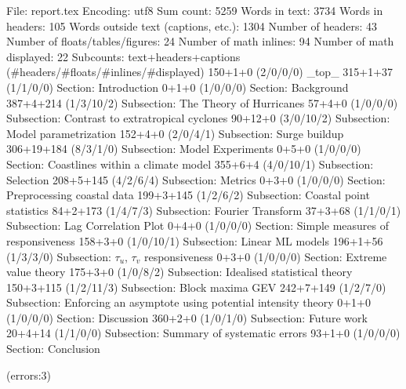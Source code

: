 
File: report.tex
Encoding: utf8
Sum count: 5259
Words in text: 3734
Words in headers: 105
Words outside text (captions, etc.): 1304
Number of headers: 43
Number of floats/tables/figures: 24
Number of math inlines: 94
Number of math displayed: 22
Subcounts:
  text+headers+captions (#headers/#floats/#inlines/#displayed)
  150+1+0 (2/0/0/0) _top_
  315+1+37 (1/1/0/0) Section: Introduction
  0+1+0 (1/0/0/0) Section: Background
  387+4+214 (1/3/10/2) Subsection: The Theory of Hurricanes
  57+4+0 (1/0/0/0) Subsection: Contrast to extratropical cyclones
  90+12+0 (3/0/10/2) Subsection: Model parametrization
  152+4+0 (2/0/4/1) Subsection: Surge buildup
  306+19+184 (8/3/1/0) Subsection: Model Experiments
  0+5+0 (1/0/0/0) Section: Coastlines within a climate model
  355+6+4 (4/0/10/1) Subsection: Selection
  208+5+145 (4/2/6/4) Subsection: Metrics
  0+3+0 (1/0/0/0) Section: Preprocessing coastal data
  199+3+145 (1/2/6/2) Subsection: Coastal point statistics
  84+2+173 (1/4/7/3) Subsection: Fourier Transform
  37+3+68 (1/1/0/1) Subsection: Lag Correlation Plot
  0+4+0 (1/0/0/0) Section: Simple measures of responsiveness
  158+3+0 (1/0/10/1) Subsection: Linear ML models
  196+1+56 (1/3/3/0) Subsection: $\tau_u$, $\tau_v$ responsiveness
  0+3+0 (1/0/0/0) Section: Extreme value theory
  175+3+0 (1/0/8/2) Subsection: Idealised statistical theory
  150+3+115 (1/2/11/3) Subsection: Block maxima GEV
  242+7+149 (1/2/7/0) Subsection: Enforcing an asymptote using potential intensity theory 
  0+1+0 (1/0/0/0) Section: Discussion
  360+2+0 (1/0/1/0) Subsection: Future work
  20+4+14 (1/1/0/0) Subsection: Summary of systematic errors
  93+1+0 (1/0/0/0) Section: Conclusion

(errors:3)
